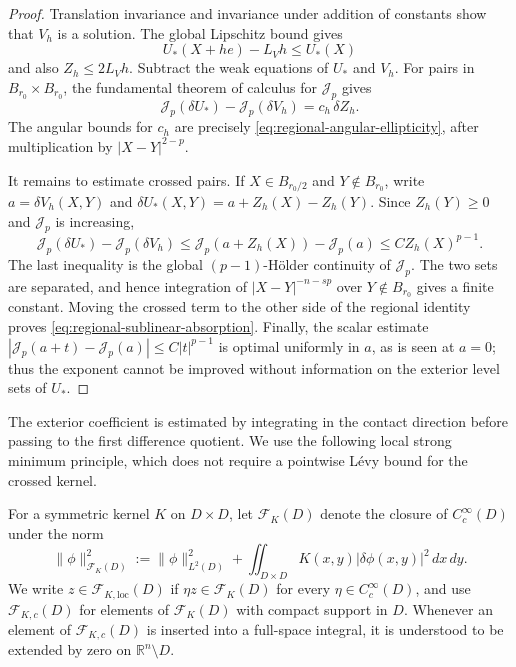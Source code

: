 \documentclass[11pt,reqno]{amsart}
\numberwithin{equation}{section}
\newcommand{\R}{\mathbb R}
\newcommand{\Jp}{\mathcal J_p}
\newcommand{\dd}{\,d}
\theoremstyle{remark}
\begin{document}
\begin{proof}
Translation invariance and invariance under addition of constants show that
$V_h$ is a solution.  The global Lipschitz bound gives
\[
 U_*(X+he)-L_Vh\le U_*(X)
\]
and also $Z_h\le2L_Vh$.  Subtract the weak equations of $U_*$ and $V_h$.
For pairs in $B_{r_0}\times B_{r_0}$, the fundamental theorem of calculus
for $\Jp$ gives
\[
 \Jp(\delta U_*)-\Jp(\delta V_h)
 =c_h\,\delta Z_h.
\]
The angular bounds for $c_h$ are precisely
\eqref{eq:regional-angular-ellipticity}, after multiplication by
$|X-Y|^{2-p}$.

It remains to estimate crossed pairs.  If
$X\in B_{r_0/2}$ and $Y\notin B_{r_0}$, write
$a=\delta V_h(X,Y)$ and
$\delta U_*(X,Y)=a+Z_h(X)-Z_h(Y)$.  Since $Z_h(Y)\ge0$ and $\Jp$ is
increasing,
\[
 \Jp(\delta U_*)-\Jp(\delta V_h)
 \le \Jp(a+Z_h(X))-\Jp(a)
 \le C Z_h(X)^{p-1}.
\]
The last inequality is the global $(p-1)$-H\"older continuity of $\Jp$.
The two sets are separated, and hence integration of
$|X-Y|^{-n-sp}$ over $Y\notin B_{r_0}$ gives a finite constant.  Moving the
crossed term to the other side of the regional identity proves
\eqref{eq:regional-sublinear-absorption}.  Finally, the scalar estimate
$|\Jp(a+t)-\Jp(a)|\le C|t|^{p-1}$ is optimal uniformly in $a$, as is seen
at $a=0$; thus the exponent cannot be improved without information on the
exterior level sets of $U_*$.  
\end{proof}

The exterior coefficient is estimated by integrating in the contact
direction before passing to the first difference quotient.  We use the
following local strong minimum principle, which does not require a
pointwise L\'evy bound for the crossed kernel.

For a symmetric kernel \(K\) on \(D\times D\), let
\(\mathcal F_K(D)\) denote the closure of \(C_c^\infty(D)\) under the
norm
\[
 \|\phi\|_{\mathcal F_K(D)}^2
 :=\|\phi\|_{L^2(D)}^2
 +\iint_{D\times D}K(x,y)|\delta\phi(x,y)|^2\dd x\!\dd y.
\]
We write \(z\in\mathcal F_{K,\mathrm{loc}}(D)\) if
\(\eta z\in\mathcal F_K(D)\) for every
\(\eta\in C_c^\infty(D)\), and use
\(\mathcal F_{K,c}(D)\) for elements of \(\mathcal F_K(D)\) with
compact support in \(D\).
Whenever an element of \(\mathcal F_{K,c}(D)\) is inserted into a
full-space integral, it is understood to be extended by zero on
\(\R^n\setminus D\).
\end{document}
